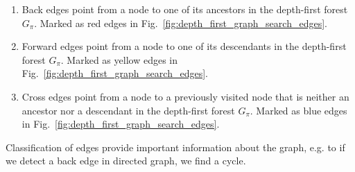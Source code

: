 \documentclass[main.tex]{subfiles}
\begin{document}
\begin{enumerate}
\item Back edges point from a node to one of its ancestors in the depth-first forest $G_\pi$. Marked as red edges in Fig.~\ref{fig:depth_first_graph_search_edges}.

\item Forward edges point from a node to one of its descendants in the depth-first forest $G_\pi$. Marked as yellow edges in Fig.~\ref{fig:depth_first_graph_search_edges}.

\item Cross edges point from a node to a previously visited node that is neither an ancestor nor a descendant in the depth-first forest $G_\pi$.  Marked as blue edges in Fig.~\ref{fig:depth_first_graph_search_edges}.
\end{enumerate}

Classification of edges provide important information about the graph, e.g. to if we detect a back edge in directed graph, we find a cycle.
\end{document}
